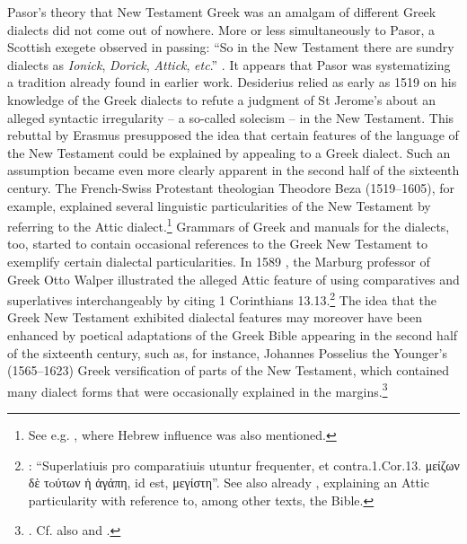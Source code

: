 Pasor’s theory that New Testament Greek was an amalgam of different Greek dialects did not come out of nowhere. More or less simultaneously to Pasor, a Scottish exegete observed in passing: “So in the New Testament there are sundry dialects as \textit{Ionick}, \textit{Dorick}, \textit{Attick}, \textit{etc}.” \citep[102]{Weemes1632}. It appears that Pasor was systematizing a tradition already found in earlier work. Desiderius \citet[270]{Erasmus1519} relied as early as 1519 on his knowledge of the Greek dialects to refute a judgment of St Jerome’s about an alleged syntactic irregularity – a so-called solecism – in the New Testament. This rebuttal by Erasmus presupposed the idea that certain features of the language of the New Testament could be explained by appealing to a Greek dialect. Such an assumption became even more clearly apparent in the second half of the sixteenth century. The French-Swiss Protestant theologian Theodore Beza (1519–1605), for example, explained several linguistic particularities of the New Testament by referring to the Attic dialect.\footnote{See e.g. \citet[\textsc{i.}226, \textsc{ii}.355]{Beza1594}, where Hebrew influence was also mentioned.} Grammars of Greek and manuals for the dialects, too, started to contain occasional references to the Greek New Testament to exemplify certain dialectal particularities. In 1589 , the Marburg professor of Greek Otto Walper illustrated the alleged Attic feature of using comparatives and superlatives interchangeably by citing 1 Corinthians 13.13.\footnote{\citet[32]{Walper1589}: “Superlatiuis pro comparatiuis utuntur frequenter, et contra.1.Cor.13. μείζων δὲ τoύτων ἡ ἀγάπη, id est, μεγίστη”. See also already \citet[251]{Ruland1556}, explaining an Attic particularity with reference to, among other texts, the Bible.} The idea that the Greek New Testament exhibited dialectal features may moreover have been enhanced by poetical adaptations of the Greek Bible appearing in the second half of the sixteenth century, such as, for instance, Johannes Posselius the Younger’s (1565–1623) Greek versification of parts of the New Testament, which contained many dialect forms that were occasionally explained in the margins.\footnote{\citet{Posselius1599}. Cf. also \citet{Jamot1593} and \citet{Keimann1649}.}

